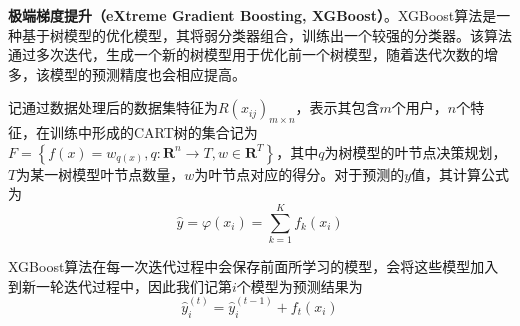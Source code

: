 \documentclass{MathorCupModeling}
\begin{document}

	\textbf{极端梯度提升（eXtreme Gradient Boosting, XGBoost）}。XGBoost算法是一种基于树模型的优化模型，其将弱分类器组合，训练出一个较强的分类器。该算法通过多次迭代，生成一个新的树模型用于优化前一个树模型，随着迭代次数的增多，该模型的预测精度也会相应提高\textcolor{blue}{\cite{pxgboost1}}。

		记通过数据处理后的数据集特征为$R\left(x_{ij}\right)_{m\times n}$，表示其包含$m$个用户，$n$个特征，在训练中形成的CART树的集合记为$F=\left\{f\left(x\right)=w_{q\left(x\right)},q:\mathbf{R}^n\to T,w\in \mathbf{R}^T\right\}$，其中$q$为树模型的叶节点决策规划，$T$为某一树模型叶节点数量，$w$为叶节点对应的得分\textcolor{blue}{\cite{pxgboost2}}。对于预测的$y$值，其计算公式为
		\begin{equation}
			\hat{y}=\varphi \left( x_i \right) =\sum\limits_{k=1}^K{f_k\left( x_i \right)} \label{fXGBoostypre}
		\end{equation}
	
		XGBoost算法在每一次迭代过程中会保存前面所学习的模型，会将这些模型加入到新一轮迭代过程中，因此我们记第$i$个模型为预测结果为
		\begin{equation}
			\hat{y}_{i}^{\left(t\right)}=\hat{y}_{i}^{\left(t-1\right)}+f_t\left(x_i\right) \label{fXGBoostyprei}
		\end{equation}
		
\end{document}
